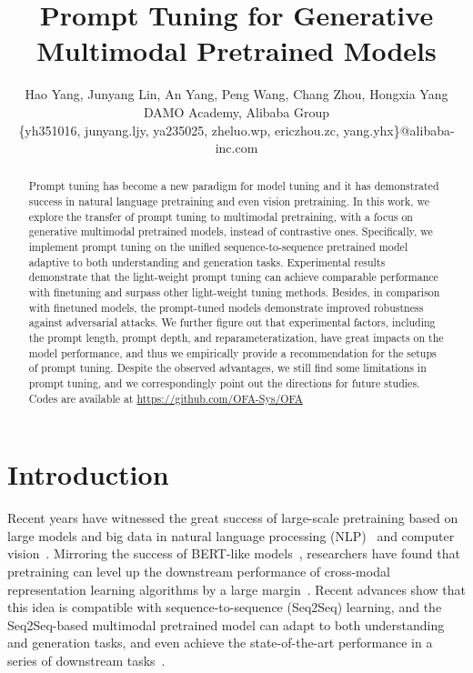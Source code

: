 \documentclass[11pt]{article}
\title{Prompt Tuning for Generative Multimodal Pretrained Models}
\author{Hao Yang, Junyang Lin, An Yang, Peng Wang, Chang Zhou, Hongxia Yang \\ 
DAMO Academy, Alibaba Group \\ 
\{yh351016, junyang.ljy, ya235025, zheluo.wp, ericzhou.zc, yang.yhx\}@alibaba-inc.com}
\begin{document}
\maketitle
\begin{abstract}
Prompt tuning has become a new paradigm for model tuning and it has demonstrated success in natural language pretraining and even vision pretraining. 
In this work, we explore the transfer of prompt tuning to multimodal pretraining, with a focus on generative multimodal pretrained models, instead of contrastive ones. 
Specifically, we implement prompt tuning on the unified sequence-to-sequence pretrained model adaptive to both understanding and generation tasks. 
Experimental results demonstrate that the light-weight prompt tuning can achieve comparable performance with finetuning and surpass other light-weight tuning methods. 
Besides, in comparison with finetuned models, the prompt-tuned models demonstrate improved robustness against adversarial attacks. 
We further figure out that experimental factors, including the prompt length, prompt depth, and reparameteratization, have great impacts on the model performance, and thus we empirically provide a recommendation for the setups of prompt tuning. 
Despite the observed advantages, we still find some limitations in prompt tuning, and we correspondingly point out the directions for future studies. Codes are available at \url{https://github.com/OFA-Sys/OFA}


\end{abstract}

\renewcommand{\thefootnote}{\fnsymbol{footnote}}

\section{Introduction}

Recent years have witnessed the great success of large-scale pretraining based on large models and big data in natural language processing (NLP)~\citep{gpt, bert, xlnet, roberta, t5, gpt3} and computer vision~\citep{simclr, simclrv2, moco, mocov3, beit, mae}. 
Mirroring the success of BERT-like models~\citep{bert}, researchers have found that pretraining can level up the downstream performance of cross-modal representation learning algorithms by a large margin~\citep{uniter, vilbert, vl-bert, lxmert}. 
Recent advances show that this idea is compatible with sequence-to-sequence (Seq2Seq) learning, and the Seq2Seq-based multimodal pretrained model can adapt to both understanding and generation tasks, and even achieve the state-of-the-art performance in a series of downstream tasks~\citep{vlt5, simvlm, ofa}.
\end{document}
